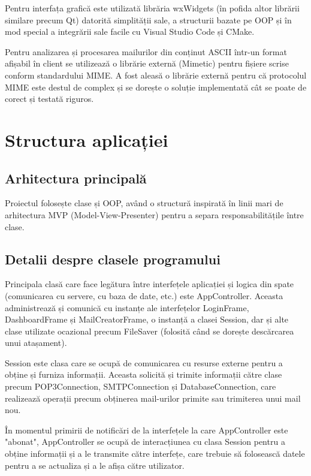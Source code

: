 \documentclass[runningheads]{llncs}
\begin{document}
Pentru interfața grafică este utilizată librăria wxWidgets (în pofida altor librării similare precum Qt) datorită simplității sale, a structurii bazate pe OOP și în mod special a integrării sale facile cu Visual Studio Code și CMake.

Pentru analizarea și procesarea mailurilor din conținut ASCII într-un format afișabil în client se utilizează o librărie externă (Mimetic) pentru fișiere scrise conform standardului MIME\cite{ref_rfc_mime}. A fost aleasă o librărie externă pentru că protocolul MIME este destul de complex și se dorește o soluție implementată cât se poate de corect și testată riguros.



\section{Structura aplicației}


\subsection{Arhitectura principală}

Proiectul folosește clase și OOP, având o structură inspirată în linii mari de arhitectura MVP (Model-View-Presenter) pentru a separa responsabilitățile între clase.



\subsection{Detalii despre clasele programului}


Principala clasă care face legătura între interfețele aplicației și logica din spate (comunicarea cu servere, cu baza de date, etc.) este AppController. Aceasta administrează și comunică cu instanțe ale interfețelor LoginFrame, DashboardFrame și MailCreatorFrame, o instanță a clasei Session, dar și alte clase utilizate ocazional precum FileSaver (folosită când se dorește descărcarea unui atașament).

Session este clasa care se ocupă de comunicarea cu resurse externe pentru a obține și furniza informații. Aceasta solicită și trimite informații către clase precum POP3Connection, SMTPConnection și DatabaseConnection, care realizează operații precum obținerea mail-urilor primite sau trimiterea unui mail nou.

În momentul primirii de notificări de la interfețele la care AppController este "abonat", AppController se ocupă de interacțiunea cu clasa Session pentru a obține informații și a le transmite către interfețe, care trebuie să folosească datele pentru a se actualiza și a le afișa către utilizator.
\end{document}
